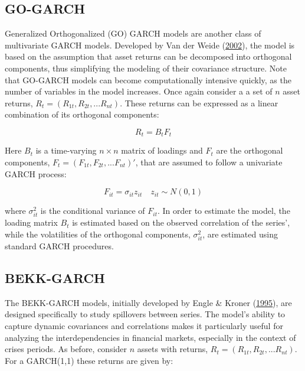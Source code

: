 \documentclass[11pt,preprint, authoryear]{elsarticle}
\numberwithin{equation}{section}
\numberwithin{figure}{section}
\numberwithin{table}{section}
\begin{document}
\hypertarget{go-garch}{%
\subsection{GO-GARCH}\label{go-garch}}

Generalized Orthogonalized (GO) GARCH models are another class of
multivariate GARCH models. Developed by Van der Weide
(\protect\hyperlink{ref-VanDerWeide2002}{2002}), the model is based on
the assumption that asset returns can be decomposed into orthogonal
components, thus simplifying the modeling of their covariance structure.
Note that GO-GARCH models can become computationally intensive quickly,
as the number of variables in the model increases. Once again consider a
a set of \(n\) asset returns, \(R_t = (R_{1t}, R_{2t}, ... R_{nt})\).
These returns can be expressed as a linear combination of its orthogonal
components:

\begin{equation}
R_t = B_t F_t \label{eq4}
\end{equation}

Here \(B_t\) is a time-varying \(n \times n\) matrix of loadings and
\(F_t\) are the orthogonal components,
\(F_t = (F_{1t}, F_{2t}, ... F_{nt})'\), that are assumed to follow a
univariate GARCH process:

\begin{equation}
F_{it} = \sigma_{it}z_{it} \quad z_{it} \sim N(0,1)\label{eq5}
\end{equation}

where \(\sigma^2_{it}\) is the conditional variance of \(F_{it}\). In
order to estimate the model, the loading matrix \(B_t\) is estimated
based on the observed correlation of the series', while the volatilities
of the orthogonal components, \(\sigma^2_{it}\), are estimated using
standard GARCH procedures.

\hypertarget{bekk-garch}{%
\subsection{BEKK-GARCH}\label{bekk-garch}}

The BEKK-GARCH models, initially developed by Engle \& Kroner
(\protect\hyperlink{ref-Bekk1995}{1995}), are designed specifically to
study spillovers between series. The model's ability to capture dynamic
covariances and correlations makes it particularly useful for analyzing
the interdependencies in financial markets, especially in the context of
crises periods. As before, consider \(n\) assets with returns,
\(R_t = (R_{1t}, R_{2t}, ... R_{nt})\). For a GARCH(1,1) these returns
are given by:
\end{document}
